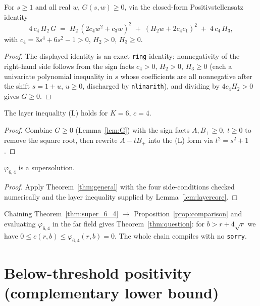 \begin{lemma}\label{lem:G}
\leanok
For $s\ge1$ and all real $w$, $G(s,w)\ge0$, via the closed-form Positivstellensatz
identity
\[
  4\,c_4\,H_2\,G \;=\; H_2\,(2c_4w^2+c_3w)^2 \;+\; (H_2w+2c_4c_1)^2 \;+\; 4\,c_4\,H_3,
\]
with $c_4=3s^4+6s^2-1>0$, $H_2>0$, $H_3\ge0$.
\end{lemma}
\begin{proof}\leanok
The displayed identity is an exact \texttt{ring} identity; nonnegativity of the
right-hand side follows from the sign facts $c_4>0$, $H_2>0$, $H_3\ge0$ (each a
univariate polynomial inequality in $s$ whose coefficients are all nonnegative
after the shift $s=1+u$, $u\ge0$, discharged by \texttt{nlinarith}), and dividing
by $4c_4H_2>0$ gives $G\ge0$.
\end{proof}

\begin{lemma}\label{lem:layercore}
\leanok
{}
The layer inequality (L) holds for $K=6$, $c=4$.
\end{lemma}
\begin{proof}\leanok
Combine $G\ge0$ (Lemma~\ref{lem:G}) with the sign facts $A,B_{+}\ge0$, $t\ge0$ to
remove the square root, then rewrite $A-tB_{+}$ into the (L) form via $t^2=s^2+1$.
\end{proof}

\begin{theorem}\label{thm:super_6_4}
\leanok
{}
$\varphi_{6,4}$ is a supersolution.
\end{theorem}
\begin{proof}\leanok
Apply Theorem~\ref{thm:general} with the four side-conditions checked numerically
and the layer inequality supplied by Lemma~\ref{lem:layercore}.
\end{proof}

Chaining Theorem~\ref{thm:super_6_4} $\to$ Proposition~\ref{prop:comparison} and
evaluating $\varphi_{6,4}$ in the far field gives Theorem~\ref{thm:question}: for
$b>r+4\sqrt r$ we have $0\le e(r,b)\le\varphi_{6,4}(r,b)=0$. The whole chain compiles
with no \texttt{sorry}.

\section{Below-threshold positivity (complementary lower bound)}


